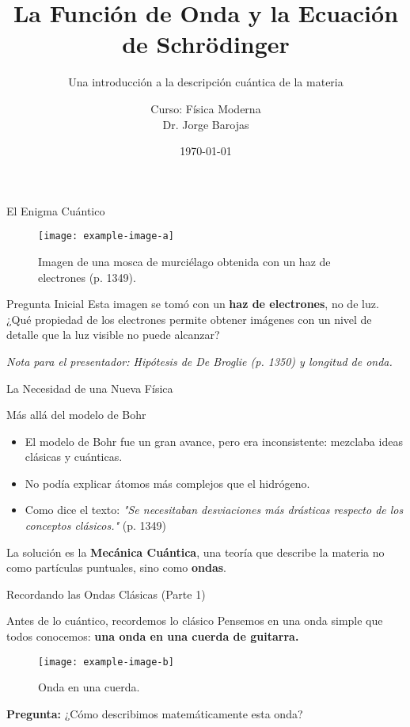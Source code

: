 \documentclass{beamer}
\title{La Función de Onda y la Ecuación de Schrödinger}
\subtitle{Una introducción a la descripción cuántica de la materia}
\author{Curso: Física Moderna \\ Dr. Jorge Barojas}
\date{\today}
\begin{document}
\begin{frame}
  \titlepage
\end{frame}

\begin{frame}{El Enigma Cuántico}
  \begin{figure}
    \texttt{[image: example-image-a]} %
    \caption{Imagen de una mosca de murciélago obtenida con un haz de electrones (p. 1349).}
  \end{figure}
  \begin{block}{Pregunta Inicial}
    Esta imagen se tomó con un \textbf{haz de electrones}, no de luz.
    \vspace{0.5em}
    ¿Qué propiedad de los electrones permite obtener imágenes con un nivel de detalle que la luz visible no puede alcanzar?
  \end{block}
  \tiny{\textit{Nota para el presentador: Hipótesis de De Broglie (p. 1350) y longitud de onda.}}
\end{frame}

\begin{frame}{La Necesidad de una Nueva Física}
  \begin{block}{Más allá del modelo de Bohr}
    \begin{itemize}
      \item El modelo de Bohr fue un gran avance, pero era inconsistente: mezclaba ideas clásicas y cuánticas.
      \item No podía explicar átomos más complejos que el hidrógeno.
      \item Como dice el texto: \textit{"Se necesitaban desviaciones más drásticas respecto de los conceptos clásicos."} (p. 1349)
    \end{itemize}
  \end{block}
  \pause
  La solución es la \textbf{Mecánica Cuántica}, una teoría que describe la materia no como partículas puntuales, sino como \textbf{ondas}.
\end{frame}

\begin{frame}{Recordando las Ondas Clásicas (Parte 1)}
  \begin{block}{Antes de lo cuántico, recordemos lo clásico}
    Pensemos en una onda simple que todos conocemos: \textbf{una onda en una cuerda de guitarra.}
  \end{block}
  \begin{figure}
    \centering
    \texttt{[image: example-image-b]} %
    \caption{Onda en una cuerda.}
  \end{figure}
  \textbf{Pregunta:} ¿Cómo describimos matemáticamente esta onda?
\end{frame}
\end{document}
